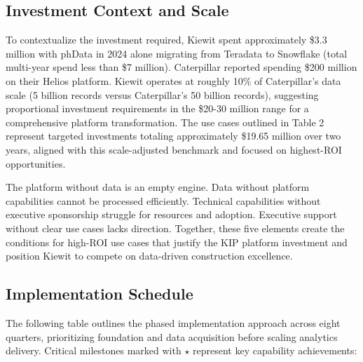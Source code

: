 \documentclass[12pt, a4paper]{article}
\begin{document}
\subsection{Investment Context and Scale}

To contextualize the investment required, Kiewit spent approximately \$3.3 million with phData in 2024 alone migrating from Teradata to Snowflake (total multi-year spend less than \$7 million). Caterpillar reported spending \$200 million on their Helios platform. Kiewit operates at roughly 10\% of Caterpillar's data scale (5 billion records versus Caterpillar's 50 billion records), suggesting proportional investment requirements in the \$20-30 million range for a comprehensive platform transformation. The use cases outlined in Table 2 represent targeted investments totaling approximately \$19.65 million over two years, aligned with this scale-adjusted benchmark and focused on highest-ROI opportunities.

The platform without data is an empty engine. Data without platform capabilities cannot be processed efficiently. Technical capabilities without executive sponsorship struggle for resources and adoption. Executive support without clear use cases lacks direction. Together, these five elements create the conditions for high-ROI use cases that justify the KIP platform investment and position Kiewit to compete on data-driven construction excellence.

\subsection{Implementation Schedule}

The following table outlines the phased implementation approach across eight quarters, prioritizing foundation and data acquisition before scaling analytics delivery. Critical milestones marked with $\star$ represent key capability achievements:

\vspace{0.5em}
\end{document}
